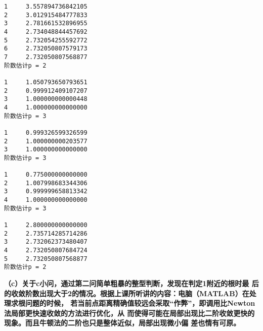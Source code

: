 \documentclass[12pt,a4paper,utf8]{ctexart}
\begin{document}
\begin{enumerate}
\begin{lstlisting}[frame=single]
1     3.557894736842105
2     3.012915484777833
3     2.781661532896955
4     2.734048844457692
5     2.732054255592772
6     2.732050807579173
7     2.732050807568877
阶数估计p = 2

1     1.050793650793651
2     0.999912409107207
3     1.000000000000448
4     1.000000000000000
阶数估计p = 3

1     0.999326599326599
2     1.000000000203577
3     1.000000000000000
阶数估计p = 3

1     0.775000000000000
2     1.007998683344306
3     0.999999658813342
4     1.000000000000000
阶数估计p = 3

1     2.800000000000000
2     2.735714285714286
3     2.732062373480407
4     2.732050807684724
5     2.732050807568877
阶数估计p = 2
\end{lstlisting}
\textcolor[rgb]{.3,.3,.7}
{\bfseries \quad（c）关于c小问，通过第二问简单粗暴的整型判断，发现在判定1附近的根时最
后的收敛阶数出现大于2的情况。根据上课所听讲的内容：电脑（{MATLAB}）在处理求根问题的时候，
若当前点距离精确值较远会采取“作弊”，即调用比Newton法局部更快速收敛的方法进行优化，从
而使得可能在局部出现比二阶收敛更快的现象。而且牛顿法的二阶也只是整体近似，局部出现微小偏
差也情有可原。}



\end{enumerate}
\end{document}
